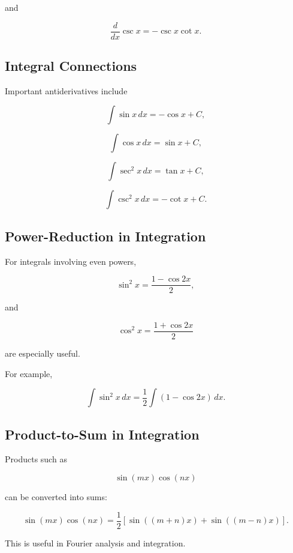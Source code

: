 and

\[
\boxed{
\frac{d}{dx}\csc x
=
-\csc x\cot x.
}
\]

\subsection{Integral Connections}
\label{subsec:trig-integral-reference}

Important antiderivatives include

\[
\boxed{
\int\sin x\,dx
=
-\cos x+C,
}
\]

\[
\boxed{
\int\cos x\,dx
=
\sin x+C,
}
\]

\[
\boxed{
\int\sec^2x\,dx
=
\tan x+C,
}
\]

\[
\boxed{
\int\csc^2x\,dx
=
-\cot x+C.
}
\]

\subsection{Power-Reduction in Integration}
\label{subsec:power-reduction-integration}

For integrals involving even powers,

\[
\boxed{
\sin^2x
=
\frac{1-\cos2x}{2},
}
\]

and

\[
\boxed{
\cos^2x
=
\frac{1+\cos2x}{2}
}
\]

are especially useful.

For example,

\[
\int\sin^2x\,dx
=
\frac12
\int
(1-\cos2x)\,dx.
\]

\subsection{Product-to-Sum in Integration}
\label{subsec:product-to-sum-integration}

Products such as

\[
\sin(mx)\cos(nx)
\]

can be converted into sums:

\[
\boxed{
\sin(mx)\cos(nx)
=
\frac12
\left[
\sin((m+n)x)
+
\sin((m-n)x)
\right].
}
\]

This is useful in Fourier analysis and integration.

